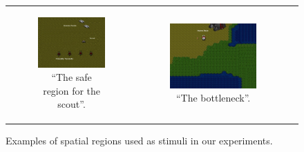 \documentclass[11pt,letterpaper]{article}
\begin{document}
\begin{figure}
\begin{tabular}{c c c}
\begin{subfigure}[b]{0.32\textwidth}
  \includegraphics[width=\textwidth]{figures/safety-3.jpg}
  \caption{``The safe region for the scout''.}
\end{subfigure} & 
\begin{subfigure}[b]{0.32\textwidth}
  \includegraphics[width=\textwidth]{figures/bottleneck.JPG}
 \caption{``The bottleneck''.}
  \label{fig:safety}
  \end{subfigure}\\
\end{tabular}
  \caption{Examples of spatial regions used as stimuli in our experiments.}
  \label{fig:examples}
\end{figure}
\end{document}

